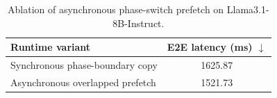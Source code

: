\begin{table}[t]
\centering
\small
\caption{Ablation of asynchronous phase-switch prefetch on Llama3.1-8B-Instruct.}
\begin{tabular}{lc}
\toprule
Runtime variant & E2E latency (ms) $\downarrow$ \\
\midrule
Synchronous phase-boundary copy & 1625.87 \\
Asynchronous overlapped prefetch & 1521.73 \\
\bottomrule
\end{tabular}
\label{tab:overlap-ablation}
\end{table}
